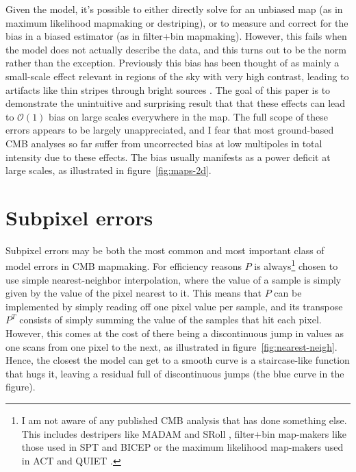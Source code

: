 \documentclass[twocolumn,apj]{aastex63}
\begin{document}
Given the model, it's possible to either directly solve for
an unbiased map (as in maximum likelihood mapmaking or destriping),
or to measure and correct for the bias in a biased estimator
(as in filter+bin mapmaking). However, this fails when the model
does not actually describe the data, and this turns out to be
the norm rather than the exception. Previously this bias has
been thought of as mainly a small-scale effect relevant in
regions of the sky with very high contrast, leading to artifacts
like thin stripes through bright sources \citep{xgls-2017,model-error}.
The goal of this paper is to
demonstrate the unintuitive and surprising result that that these effects
can lead to $\mathcal{O}(1)$ bias on large scales everywhere
in the map. The full scope of these errors appears to be largely
unappreciated, and I fear that most ground-based CMB analyses
so far suffer from uncorrected bias at low multipoles in total intensity
due to these effects. The bias usually manifests as a power
deficit at large scales, as illustrated in figure~\ref{fig:maps-2d}.

\section{Subpixel errors}
Subpixel errors may be both the most common and most important
class of model errors in CMB mapmaking.
For efficiency reasons $P$ is always\footnote{I am not aware of any
published CMB analysis that has done something else. This includes
destripers like MADAM \citep{madam/2010} and SRoll \citep{planck/hfi/maps/2018},
filter+bin map-makers like those used in SPT \citep{spt/maps/2011,spt/2021} and BICEP
\citep{bicep2a/2014} or the maximum likelihood map-makers used in ACT \citep{aiola/2020}
and QUIET \citep{quiet-gal/2015}.
}
chosen to use simple nearest-neighbor interpolation, where the
value of a sample is simply given by the value of the pixel nearest
to it. This means that $P$ can be implemented by simply reading off
one pixel value per sample, and its transpose $P^T$ consists of simply
summing the value of the samples that hit each pixel. However, this
comes at the cost of there being a discontinuous jump in values as one
scans from one pixel to the next, as illustrated in figure~\ref{fig:nearest-neigh}.
Hence, the closest the model can get to a smooth curve is a
staircase-like function that hugs it, leaving a residual full of
discontinuous jumps (the blue curve in the figure).
\end{document}
